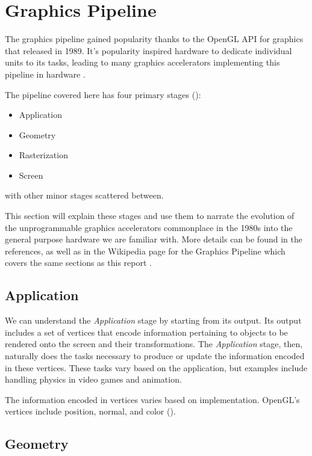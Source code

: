 \section{Graphics Pipeline}

The graphics pipeline gained popularity thanks to the OpenGL API for graphics
that released in 1989. It's popularity inspired hardware to dedicate individual units
to its tasks, leading to many graphics accelerators implementing this pipeline in hardware
\cite{mcclanahan2010history}.

The pipeline covered here has four primary stages (\cite{crow2004evolution}):

\begin{itemize}
    \item Application
    \item Geometry
    \item Rasterization
    \item Screen
\end{itemize}

with other minor stages scattered between.

This section will explain these stages and use them to narrate the evolution of the unprogrammable graphics accelerators commonplace in the 1980s into the general purpose hardware we are familiar with.
More details can be found in the references, as well as in the Wikipedia page for
the Graphics Pipeline which covers the same sections as this report \cite{wiki:Graphics_pipeline}.

\subsection{Application}

We can understand the \textit{Application} stage by starting from its output.
Its output includes a set of vertices that encode information pertaining to objects to be rendered onto the screen and their transformations.
The \textit{Application} stage, then, naturally does the tasks necessary to produce or update the information encoded in these vertices.
These tasks vary based on the application, but examples include handling physics in video games and animation.

The information encoded in vertices varies based on implementation. OpenGL's vertices include position, normal, and color (\cite{wiki:vertex}).

\subsection{Geometry}


